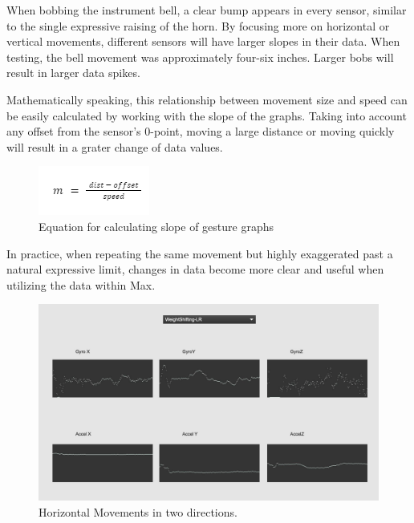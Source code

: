 When bobbing the instrument bell, a clear bump appears in every sensor, similar to the single expressive raising of the horn. By focusing more on horizontal or vertical movements, different sensors will have larger slopes in their data. When testing, the bell movement was approximately four-six inches. Larger bobs will result in larger data spikes.

Mathematically speaking, this relationship between movement size and speed can be easily calculated by working with the slope of the graphs. Taking into account any offset from the sensor's 0-point, moving a large distance or moving quickly will result in a grater change of data values.

\begin{figure}
    \centering
    \includegraphics{slopeEqu.png}
    \caption{Equation for calculating slope of gesture graphs}
    \label{fig:mequSlope}
\end{figure}

In practice, when repeating the same movement but highly exaggerated past a natural expressive limit, changes in data become more clear and useful when utilizing the data within Max. 

\begin{figure}
    \centering
    \includegraphics[scale=0.2]{diagrams/gestureData/weightshifting.png}
    \caption{Horizontal Movements in two directions.}
    \label{fig:exHor}
\end{figure}

